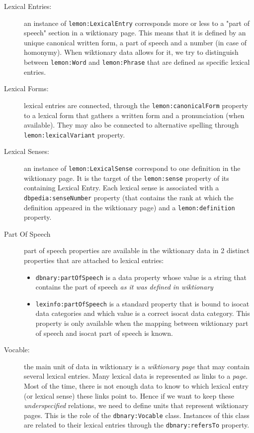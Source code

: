 \documentclass[10pt, a4paper]{article}
\begin{document}
\begin{description}
\item[Lexical Entries:] an instance of \texttt{lemon:LexicalEntry} corresponds more or less to a "part of speech" section in a wiktionary page. This means that it is defined by an unique canonical written form, a part of speech and a number (in case of homonymy). When wiktionary data allows for it, we try to distinguish between \texttt{lemon:Word} and \texttt{lemon:Phrase} that are defined as specific lexical entries.
\item[Lexical Forms:] lexical entries are connected, through the \texttt{lemon:canonicalForm} property to a lexical form that gathers a written form and a pronunciation (when available). They may also be connected to alternative spelling through \texttt{lemon:lexicalVariant} property. 
\item[Lexical Senses:] an instance of \texttt{lemon:LexicalSense} correspond to one definition in the wiktionary page. It is the target of the \texttt{lemon:sense} property of its containing Lexical Entry. Each lexical sense is associated with a \texttt{dbpedia:senseNumber} property (that contains the rank at which the definition appeared in the wiktionary page) and a \texttt{lemon:definition} property.
\item[Part Of Speech] part of speech properties are available in the wiktionary data in 2 distinct properties that are attached to lexical entries:
\begin{itemize}
\item \texttt{dbnary:partOfSpeech} is a data property whose value is a string that contains the part of speech \textit{as it was defined in wiktionary} 
\item \texttt{lexinfo:partOfSpeech} is a standard property that is bound to isocat data categories and which value is a correct isocat data category. This property is only available when the mapping between wiktionary part of speech and isocat part of speech is known.
\end{itemize}
\item[Vocable:] the main unit of data in wiktionary is a \textit{wiktionary page} that may contain several lexical entries. Many lexical data is represented as links to a \textit{page}. Most of the time, there is not enough data to know to which lexical entry (or lexical sense) these links point to. Hence if we want to keep these \textit{underspecified} relations, we need to define units that represent wiktionary pages. This is the role of the \texttt{dbnary:Vocable} class. Instances of this class are related to their lexical entries through the \texttt{dbnary:refersTo} property. 

\end{description}
\end{document}
